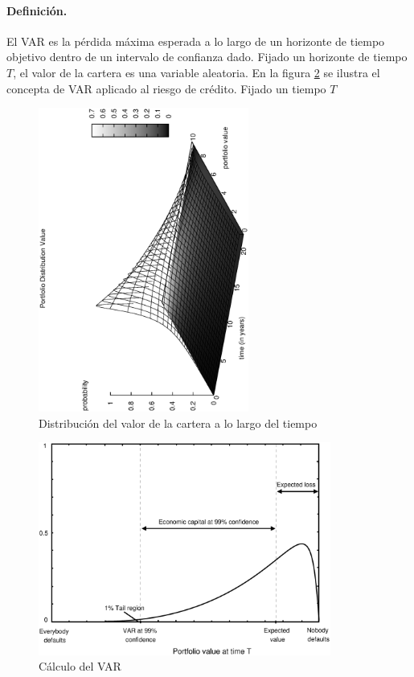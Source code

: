 \paragraph{Definici\'on.} El VAR es la p\'erdida m\'axima esperada a lo largo
de un horizonte de tiempo objetivo dentro de un intervalo de confianza dado.
\newline
\newline
Fijado un horizonte de tiempo $T$, el valor de la cartera es una variable 
aleatoria. 
\newline
\newline
En la figura \ref{creditvar} se ilustra el concepta de VAR aplicado al riesgo 
de cr\'edito. Fijado un tiempo $T$

\begin{figure}[!hb]
\begin{center}
\includegraphics[height=10cm, angle=-90]{./images/pdistrib.ps}
\caption{Distribuci\'on del valor de la cartera a lo largo del tiempo}
\label{pdistrib}
\end{center}
\end{figure}

\begin{figure}[!hb]
\begin{center}
\includegraphics[height=7cm, angle=0]{./images/creditvar.eps}
\caption{C\'alculo del VAR}
\label{creditvar}
\end{center}
\end{figure}
